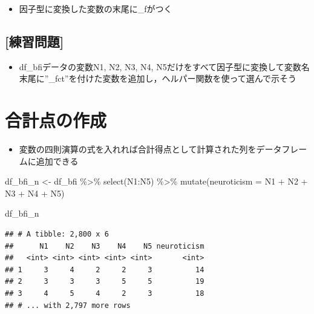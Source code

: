 \documentclass[
  xelatex,ja=standard, b5paper]{bxjsbook}
\newenvironment{Shaded}{\begin{snugshade}}{\end{snugshade}}
\newcommand{\AttributeTok}[1]{\textcolor[rgb]{0.77,0.63,0.00}{#1}}
\newcommand{\FunctionTok}[1]{\textcolor[rgb]{0.00,0.00,0.00}{#1}}
\newcommand{\NormalTok}[1]{#1}
\newcommand{\OtherTok}[1]{\textcolor[rgb]{0.56,0.35,0.01}{#1}}
\newcommand{\SpecialCharTok}[1]{\textcolor[rgb]{0.00,0.00,0.00}{#1}}
\providecommand{\tightlist}{%
  \setlength{\itemsep}{0pt}\setlength{\parskip}{0pt}}
\begin{document}
\begin{itemize}
\tightlist
\item
  因子型に変換した変数の末尾に\_fがつく
\end{itemize}

\hypertarget{ux7df4ux7fd2ux554fux984c-11}{%
\subsection{{[}練習問題{]}}\label{ux7df4ux7fd2ux554fux984c-11}}

\begin{itemize}
\tightlist
\item
  df\_bfiデータの変数N1, N2, N3, N4, N5だけをすべて因子型に変換して変数名末尾に''\_fct''を付けた変数を追加し，ヘルパー関数を使って選んで示そう
\end{itemize}

\hypertarget{mu-total}{%
\section{合計点の作成}\label{mu-total}}

\begin{itemize}
\tightlist
\item
  変数の四則演算の式を入れれば合計得点として計算された列をデータフレームに追加できる
\end{itemize}

\begin{Shaded}
\begin{Highlighting}[]
\NormalTok{df\_bfi\_n }\OtherTok{\textless{}{-}} 
\NormalTok{  df\_bfi }\SpecialCharTok{\%\textgreater{}\%}
  \FunctionTok{select}\NormalTok{(N1}\SpecialCharTok{:}\NormalTok{N5) }\SpecialCharTok{\%\textgreater{}\%}                       
  \FunctionTok{mutate}\NormalTok{(}\AttributeTok{neuroticism =}\NormalTok{ N1 }\SpecialCharTok{+}\NormalTok{ N2 }\SpecialCharTok{+}\NormalTok{ N3 }\SpecialCharTok{+}\NormalTok{ N4 }\SpecialCharTok{+}\NormalTok{ N5)}
  
\NormalTok{df\_bfi\_n}
\end{Highlighting}
\end{Shaded}

\begin{verbatim}
## # A tibble: 2,800 x 6
##      N1    N2    N3    N4    N5 neuroticism
##   <int> <int> <int> <int> <int>       <int>
## 1     3     4     2     2     3          14
## 2     3     3     3     5     5          19
## 3     4     5     4     2     3          18
## # ... with 2,797 more rows
\end{verbatim}
\end{document}
